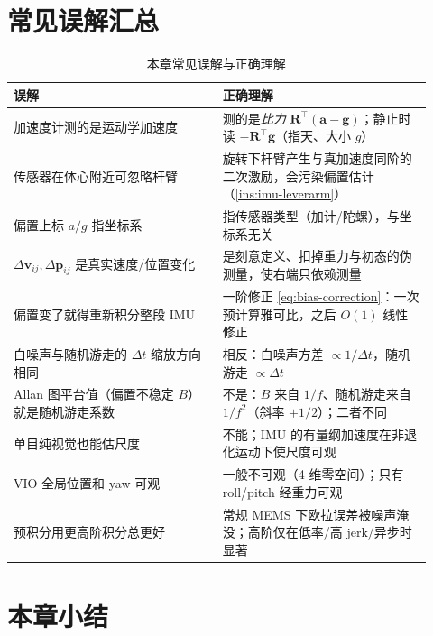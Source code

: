 \section*{常见误解汇总}

\begin{table}[H]\centering\small
\caption{本章常见误解与正确理解}
\begin{tabular}{p{0.46\linewidth}p{0.46\linewidth}}
\toprule
误解 & 正确理解 \\
\midrule
加速度计测的是运动学加速度 & 测的是\emph{比力} $\mathbf R^\top(\mathbf a-\mathbf g)$；静止时读 $-\mathbf R^\top\mathbf g$（指天、大小 $g$） \\
传感器在体心附近可忽略杆臂 & 旋转下杆臂产生与真加速度同阶的二次激励，会污染偏置估计（\cref{ins:imu-leverarm}）\\
偏置上标 $a/g$ 指坐标系 & 指传感器类型（加计/陀螺），与坐标系无关 \\
$\Delta\mathbf v_{ij},\Delta\mathbf p_{ij}$ 是真实速度/位置变化 & 是刻意定义、扣掉重力与初态的伪测量，使右端只依赖测量 \\
偏置变了就得重新积分整段 IMU & 一阶修正 \cref{eq:bias-correction}：一次预计算雅可比，之后 $O(1)$ 线性修正 \\
白噪声与随机游走的 $\Delta t$ 缩放方向相同 & 相反：白噪声方差 $\propto1/\Delta t$，随机游走 $\propto\Delta t$ \\
Allan 图平台值（偏置不稳定 $B$）就是随机游走系数 & 不是：$B$ 来自 $1/f$、随机游走来自 $1/f^2$（斜率 $+1/2$）；二者不同 \\
单目纯视觉也能估尺度 & 不能；IMU 的有量纲加速度在非退化运动下使尺度可观 \\
VIO 全局位置和 yaw 可观 & 一般不可观（4 维零空间）；只有 roll/pitch 经重力可观 \\
预积分用更高阶积分总更好 & 常规 MEMS 下欧拉误差被噪声淹没；高阶仅在低率/高 jerk/异步时显著 \\
\bottomrule
\end{tabular}
\end{table}

\section*{本章小结}

